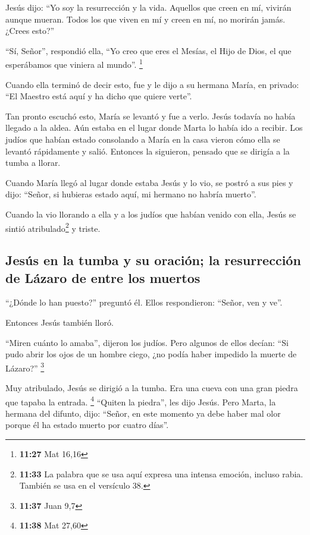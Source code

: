  Jesús dijo: ``Yo soy la resurrección y la vida. Aquellos
que creen en mí, vivirán aunque mueran.  Todos los que
viven en mí y creen en mí, no morirán jamás. ¿Crees esto?''

 ``Sí, Señor'', respondió ella, ``Yo creo que eres el
Mesías, el Hijo de Dios, el que esperábamos que viniera al mundo''.
\footnote{\textbf{11:27} Mat 16,16}

 Cuando ella terminó de decir esto, fue y le dijo a su
hermana María, en privado: ``El Maestro está aquí y ha dicho que quiere
verte''.

 Tan pronto escuchó esto, María se levantó y fue a verlo.
 Jesús todavía no había llegado a la aldea. Aún estaba en
el lugar donde Marta lo había ido a recibir.  Los judíos
que habían estado consolando a María en la casa vieron cómo ella se
levantó rápidamente y salió. Entonces la siguieron, pensado que se
dirigía a la tumba a llorar.

 Cuando María llegó al lugar donde estaba Jesús y lo vio,
se postró a sus pies y dijo: ``Señor, si hubieras estado aquí, mi
hermano no habría muerto''.

 Cuando la vio llorando a ella y a los judíos que habían
venido con ella, Jesús se sintió atribulado\footnote{\textbf{11:33} La
  palabra que se usa aquí expresa una intensa emoción, incluso rabia.
  También se usa en el versículo 38.} y triste.

\hypertarget{jesuxfas-en-la-tumba-y-su-oraciuxf3n-la-resurrecciuxf3n-de-luxe1zaro-de-entre-los-muertos}{%
\subsection{Jesús en la tumba y su oración; la resurrección de Lázaro de
entre los
muertos}\label{jesuxfas-en-la-tumba-y-su-oraciuxf3n-la-resurrecciuxf3n-de-luxe1zaro-de-entre-los-muertos}}

 ``¿Dónde lo han puesto?'' preguntó él. Ellos
respondieron: ``Señor, ven y ve''.

 Entonces Jesús también lloró.

 ``Miren cuánto lo amaba'', dijeron los judíos.
 Pero algunos de ellos decían: ``Si pudo abrir los ojos
de un hombre ciego, ¿no podía haber impedido la muerte de Lázaro?''
\footnote{\textbf{11:37} Juan 9,7}

 Muy atribulado, Jesús se dirigió a la tumba. Era una
cueva con una gran piedra que tapaba la entrada. \footnote{\textbf{11:38}
  Mat 27,60}  ``Quiten la piedra'', les dijo Jesús. Pero
Marta, la hermana del difunto, dijo: ``Señor, en este momento ya debe
haber mal olor porque él ha estado muerto por cuatro días''.


